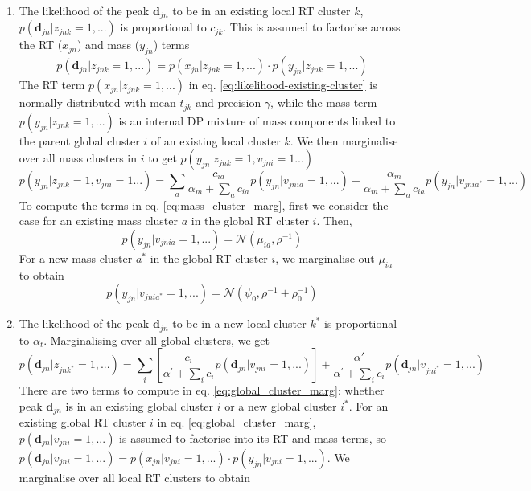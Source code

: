 \begin{enumerate}
\item The likelihood of the peak $\mathbf{d}_{jn}$ to be in an existing local RT cluster $k$, $p(\mathbf{d}_{jn}|z_{jnk}=1,...)$ is proportional to $c_{jk}$. This is assumed to factorise across the RT ($x_{jn}$) and mass ($y_{jn}$) terms
\begin{dmath}
p(\mathbf{d}_{jn}|z_{jnk}=1,...)=p(x_{jn}|z_{jnk}=1,...)\cdot p(y_{jn}|z_{jnk}=1,...)
\label{eq:likelihood-existing-cluster}
\end{dmath}
The RT term $p(x_{jn}|z_{jnk}=1,...)$ in eq. \ref{eq:likelihood-existing-cluster} is normally distributed with mean $t_{jk}$ and precision $\gamma$, while the mass term $p(y_{jn}|z_{jnk}=1,...)$ is an internal DP mixture of mass components linked to the parent global cluster $i$ of an existing local cluster $k$. We then marginalise over all mass clusters in $i$ to get $p(y_{jn}|z_{jnk}=1,v_{jni}=1...)$
\begin{dmath}
p(y_{jn}|z_{jnk}=1,v_{jni}=1...)=\sum_{a}\frac{c_{ia}}{\alpha_{m}+\sum_{a}c_{ia}}p(y_{jn}|v_{jnia}=1,...)+\frac{\alpha_{m}}{\alpha_{m}+\sum_{a}c_{ia}}p(y_{jn}|v_{jnia^{*}}=1,...)
\label{eq:mass_cluster_marg}
\end{dmath}
To compute the terms in eq. \ref{eq:mass_cluster_marg}, first we consider the case for an existing mass cluster $a$ in the global RT cluster $i$. Then,
\begin{dmath}
p(y_{jn}|v_{jnia}=1,...)=\mathcal{N}(\mu_{ia},\rho^{-1})
\end{dmath}
For a new mass cluster $a^{*}$ in the global RT cluster $i$, we marginalise out $\mu_{ia}$ to obtain
\begin{dmath}
p(y_{jn}|v_{jnia^{*}}=1,...)=\mathcal{N}(\psi_{0},\rho^{-1}+\rho_{0}^{-1})
\end{dmath}
\item The likelihood of the peak $\mathbf{d}_{jn}$ to be in a new local cluster $k^{*}$ is proportional to $\alpha_{t}$. Marginalising over all global clusters,
we get
\begin{dmath}
p(\mathbf{d}_{jn}|z_{jnk^{*}}=1,...)=\sum_{i}\left[\frac{c_{i}}{\alpha^{'}+\sum_{i}c_{i}}p(\mathbf{d}_{jn}|v_{jni}=1,...)\right]+\frac{\alpha'}{\alpha^{'}+\sum_{i}c_{i}}p(\mathbf{d}_{jn}|v_{jni^{*}}=1,...)
\label{eq:global_cluster_marg}
\end{dmath}
There are two terms to compute in eq. \ref{eq:global_cluster_marg}: whether peak $\mathbf{d}_{jn}$ is in an existing global cluster $i$ or a new global cluster $i^{*}$. For an existing global RT cluster $i$ in eq. \ref{eq:global_cluster_marg}, $p(\mathbf{d}_{jn}|v_{jni}=1,...)$ is assumed to factorise into its RT and mass terms, so $p(\mathbf{d}_{jn}|v_{jni}=1,...) = p(x_{jn}|v_{jni}=1,...)\cdot p(y_{jn}|v_{jni}=1,...)$. We marginalise over all local RT clusters to obtain

\end{enumerate}
